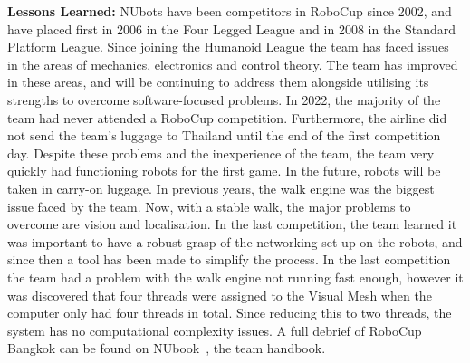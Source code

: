 \documentclass{llncs}
\begin{document}
\noindent\textbf{Lessons Learned:} NUbots have been competitors in RoboCup since 2002, and have placed first in 2006 in the Four Legged League and in 2008 in the Standard Platform League. Since joining the Humanoid League the team has faced issues in the areas of mechanics, electronics and control theory. The team has improved in these areas, and will be continuing to address them alongside utilising its strengths to overcome software-focused problems. In 2022, the majority of the team had never attended a RoboCup competition. Furthermore, the airline did not send the team's luggage to Thailand until the end of the first competition day. Despite these problems and the inexperience of the team, the team very quickly had functioning robots for the first game. In the future, robots will be taken in carry-on luggage. In previous years, the walk engine was the biggest issue faced by the team. Now, with a stable walk, the major problems to overcome are vision and localisation. In the last competition, the team learned it was important to have a robust grasp of the networking set up on the robots, and since then a tool has been made to simplify the process. In the last competition the team had a problem with the walk engine not running fast enough, however it was discovered that four threads were assigned to the Visual Mesh when the computer only had four threads in total. Since reducing this to two threads, the system has no computational complexity issues. A full debrief of RoboCup Bangkok can be found on NUbook~\cite{nubotsNUbookGit}, the team handbook.\\



\end{document}
